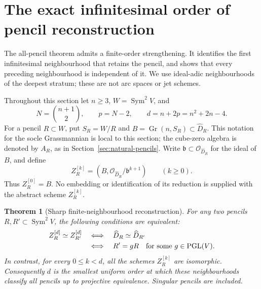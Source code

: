 \documentclass[11pt,reqno]{amsart}
\numberwithin{equation}{section}
\newtheorem{theorem}{Theorem}[section]
\theoremstyle{definition}\newtheorem{definition}[theorem]{Definition}
\theoremstyle{remark}\newtheorem{remark}[theorem]{Remark}
\newcommand{\OO}{\mathcal O}\newcommand{\II}{\mathcal I}
\DeclareMathOperator{\Sym}{Sym}\DeclareMathOperator{\Gr}{Gr}
\begin{document}
\section{The exact infinitesimal order of pencil reconstruction}
\label{sec:finite-neighbourhoods}

The all-pencil theorem admits a finite-order strengthening.  It
identifies the first infinitesimal neighbourhood that retains the
pencil, and shows that every preceding neighbourhood is independent
of it.  We use ideal-adic neighbourhoods of the deepest stratum;
these are not arc spaces or jet schemes.

Throughout this section let \(n\ge3\), \(W=\Sym^2V\), and
\begin{equation}\label{eq:pencil-detection-order}
 N=\binom{n+1}{2},\qquad p=N-2,\qquad
 d=n+2p=n^2+2n-4.
\end{equation}
For a pencil \(R\subset W\), put \(S_R=W/R\) and
\(B=\Gr(n,S_R)\subset\widehat D_R\).  This notation for the
socle Grassmannian is local to this section; the cube-zero algebra
is denoted by \(A_R\), as in Section~\ref{sec:natural-pencils}.
Write \(\mathfrak b\subset\OO_{\widehat D_R}\) for the
ideal of \(B\), and define
\begin{equation}\label{eq:finite-neighbourhood-definition}
 Z_R^{[k]}=(B,\OO_{\widehat D_R}/\mathfrak b^{k+1})
       \qquad(k\ge0).
\end{equation}
Thus \(Z_R^{[0]}=B\).  No embedding or identification of its
reduction is supplied with the abstract scheme \(Z_R^{[k]}\).

\begin{theorem}[Sharp finite-neighbourhood reconstruction]
\label{thm:sharp-finite-pencil}
For any two pencils \(R,R'\subset\Sym^2V\), the following
conditions are equivalent:
\begin{equation}\label{eq:finite-pencil-equivalences}
\begin{split}
 Z_R^{[d]}\simeq Z_{R'}^{[d]}
 &\quad\Longleftrightarrow\quad
 \widehat D_R\simeq\widehat D_{R'}\\
 &\quad\Longleftrightarrow\quad
 R'=gR\quad\text{for some }g\in\operatorname{PGL}(V).
\end{split}
\end{equation}
In contrast, for every \(0\le k<d\), all the schemes
\(Z_R^{[k]}\) are isomorphic.  Consequently \(d\) is the
smallest uniform order at which these neighbourhoods classify all
pencils up to projective equivalence.  Singular pencils are included.
\end{theorem}
\end{document}
